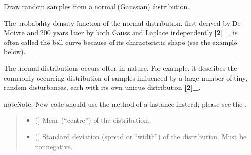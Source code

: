 \documentclass[letterpaper,10pt,english]{sphinxmanual}
\begin{document}
\begin{fulllineitems}
\label{\detokenize{metilda.controllers:metilda.controllers.pitch_art_wizard.normal}}
\pysigstartsignatures
{}
\pysigstopsignatures
\sphinxAtStartPar
Draw random samples from a normal (Gaussian) distribution.

\sphinxAtStartPar
The probability density function of the normal distribution, first
derived by De Moivre and 200 years later by both Gauss and Laplace
independently {\color{red}\bfseries{}{[}2{]}\_}, is often called the bell curve because of
its characteristic shape (see the example below).

\sphinxAtStartPar
The normal distributions occurs often in nature.  For example, it
describes the commonly occurring distribution of samples influenced
by a large number of tiny, random disturbances, each with its own
unique distribution {\color{red}\bfseries{}{[}2{]}\_}.

\begin{sphinxadmonition}{note}{Note:}
\sphinxAtStartPar
New code should use the 
method of a  instance instead;
please see the .
\end{sphinxadmonition}
\begin{quote}\begin{description}
\begin{itemize}
\item {} 
\sphinxAtStartPar
{} () \textendash{} Mean (“centre”) of the distribution.

\item {} 
\sphinxAtStartPar
{} () \textendash{} Standard deviation (spread or “width”) of the distribution. Must be
non\sphinxhyphen{}negative.


\end{itemize}
\end{description}
\end{quote}
\end{fulllineitems}
\end{document}
